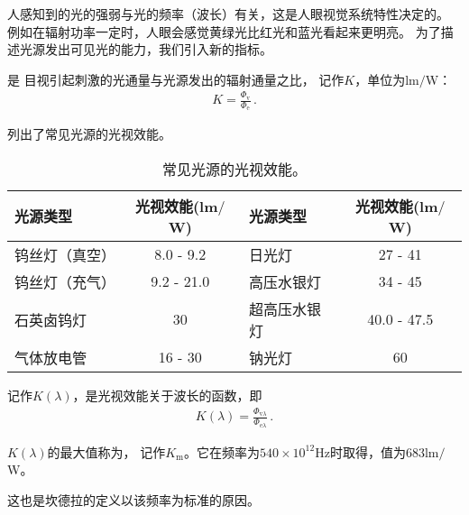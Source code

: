 人感知到的光的强弱与光的频率（波长）有关，这是人眼视觉系统特性决定的。
例如在辐射功率一定时，人眼会感觉黄绿光比红光和蓝光看起来更明亮。
为了描述光源发出可见光的能力，我们引入新的指标。

\begin{definition}
      是
      目视引起刺激的光通量与光源发出的辐射通量之比，
      记作$K$，单位为lm$/$W：
      \begin{align}
            K=\frac{\varPhi_{\mathrm{v}}}{\varPhi_{\mathrm{e}}}\, .
      \end{align}
\end{definition}

列出了常见光源的光视效能。
\begin{table}[htbp]
      \centering
      \begin{tabular}{lc|lc}
            \toprule
            \textbf{光源类型} & \textbf{光视效能(lm$/$W)} & \textbf{光源类型} & \textbf{光视效能(lm$/$W)} \\
            \midrule
            钨丝灯（真空）    & 8.0 - 9.2                 & 日光灯            & 27 - 41                   \\
            钨丝灯（充气）    & 9.2 - 21.0                & 高压水银灯        & 34 - 45                   \\
            石英卤钨灯        & 30                        & 超高压水银灯      & 40.0 - 47.5               \\
            气体放电管        & 16 - 30                   & 钠光灯            & 60                        \\
            \bottomrule
      \end{tabular}
      \caption{常见光源的光视效能。}
      \label{tab:5.ex01}
\end{table}

\begin{definition}
      记作$K(\lambda)$，是光视效能关于波长的函数，即
      \begin{align}
            K(\lambda)=\frac{\varPhi_{\mathrm{v}\lambda}}{\varPhi_{\mathrm{e}\lambda}}\, .
      \end{align}
\end{definition}

\begin{definition}
      $K(\lambda)$的最大值称为，
      记作$K_{\mathrm{m}}$。它在频率为$540\times10^{12}\text{Hz}$时取得，值为683lm$/$W。
\end{definition}
这也是坎德拉的定义以该频率为标准的原因。

